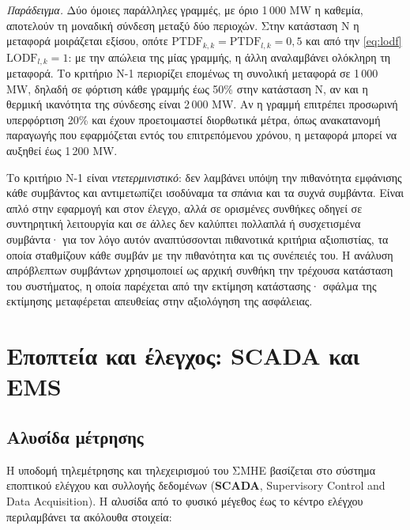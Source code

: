 \emph{Παράδειγμα.} Δύο όμοιες παράλληλες γραμμές, με όριο 1\,000 MW η καθεμία, αποτελούν τη
μοναδική σύνδεση μεταξύ δύο περιοχών. Στην κατάσταση N η μεταφορά μοιράζεται εξίσου, οπότε
$\mathrm{PTDF}_{k,k} = \mathrm{PTDF}_{l,k} = 0{,}5$ και από την \eqref{eq:lodf}
$\mathrm{LODF}_{l,k} = 1$: με την απώλεια της μίας γραμμής, η άλλη αναλαμβάνει ολόκληρη τη
μεταφορά. Το κριτήριο N-1 περιορίζει επομένως τη συνολική μεταφορά σε 1\,000 MW, δηλαδή σε
φόρτιση κάθε γραμμής έως 50\% στην κατάσταση N, αν και η θερμική ικανότητα της σύνδεσης είναι
2\,000 MW. Αν η γραμμή επιτρέπει προσωρινή υπερφόρτιση 20\% και έχουν προετοιμαστεί
διορθωτικά μέτρα, όπως ανακατανομή παραγωγής που εφαρμόζεται εντός του επιτρεπόμενου χρόνου,
η μεταφορά μπορεί να αυξηθεί έως 1\,200 MW.

Το κριτήριο N-1 είναι \emph{ντετερμινιστικό}: δεν λαμβάνει υπόψη την πιθανότητα εμφάνισης
κάθε συμβάντος και αντιμετωπίζει ισοδύναμα τα σπάνια και τα συχνά συμβάντα. Είναι απλό στην
εφαρμογή και στον έλεγχο, αλλά σε ορισμένες συνθήκες οδηγεί σε συντηρητική λειτουργία και σε
άλλες δεν καλύπτει πολλαπλά ή συσχετισμένα συμβάντα· για τον λόγο αυτόν αναπτύσσονται
πιθανοτικά κριτήρια αξιοπιστίας, τα οποία σταθμίζουν κάθε συμβάν με την πιθανότητα και τις
συνέπειές του. Η ανάλυση απρόβλεπτων συμβάντων χρησιμοποιεί ως αρχική συνθήκη την τρέχουσα
κατάσταση του συστήματος, η οποία παρέχεται από την εκτίμηση κατάστασης· σφάλμα της
εκτίμησης μεταφέρεται απευθείας στην αξιολόγηση της ασφάλειας.

\section{Εποπτεία και έλεγχος: SCADA και EMS}

\subsection{Αλυσίδα μέτρησης}

Η υποδομή τηλεμέτρησης και τηλεχειρισμού του ΣΜΗΕ βασίζεται στο σύστημα εποπτικού ελέγχου
και συλλογής δεδομένων (\textbf{SCADA}, Supervisory Control and Data Acquisition). Η αλυσίδα
από το φυσικό μέγεθος έως το κέντρο ελέγχου περιλαμβάνει τα ακόλουθα στοιχεία:

